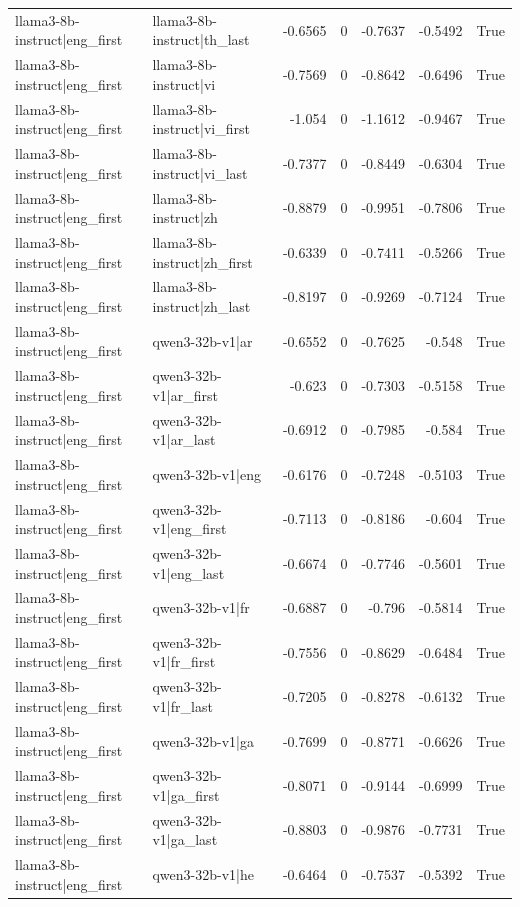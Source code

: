 \begin{table}
\begin{tabular}{l l r r r r l}
llama3-8b-instruct|eng_first & llama3-8b-instruct|th_last & -0.6565 & 0 & -0.7637 & -0.5492 & True \\
llama3-8b-instruct|eng_first & llama3-8b-instruct|vi & -0.7569 & 0 & -0.8642 & -0.6496 & True \\
llama3-8b-instruct|eng_first & llama3-8b-instruct|vi_first & -1.054 & 0 & -1.1612 & -0.9467 & True \\
llama3-8b-instruct|eng_first & llama3-8b-instruct|vi_last & -0.7377 & 0 & -0.8449 & -0.6304 & True \\
llama3-8b-instruct|eng_first & llama3-8b-instruct|zh & -0.8879 & 0 & -0.9951 & -0.7806 & True \\
llama3-8b-instruct|eng_first & llama3-8b-instruct|zh_first & -0.6339 & 0 & -0.7411 & -0.5266 & True \\
llama3-8b-instruct|eng_first & llama3-8b-instruct|zh_last & -0.8197 & 0 & -0.9269 & -0.7124 & True \\
llama3-8b-instruct|eng_first & qwen3-32b-v1|ar & -0.6552 & 0 & -0.7625 & -0.548 & True \\
llama3-8b-instruct|eng_first & qwen3-32b-v1|ar_first & -0.623 & 0 & -0.7303 & -0.5158 & True \\
llama3-8b-instruct|eng_first & qwen3-32b-v1|ar_last & -0.6912 & 0 & -0.7985 & -0.584 & True \\
llama3-8b-instruct|eng_first & qwen3-32b-v1|eng & -0.6176 & 0 & -0.7248 & -0.5103 & True \\
llama3-8b-instruct|eng_first & qwen3-32b-v1|eng_first & -0.7113 & 0 & -0.8186 & -0.604 & True \\
llama3-8b-instruct|eng_first & qwen3-32b-v1|eng_last & -0.6674 & 0 & -0.7746 & -0.5601 & True \\
llama3-8b-instruct|eng_first & qwen3-32b-v1|fr & -0.6887 & 0 & -0.796 & -0.5814 & True \\
llama3-8b-instruct|eng_first & qwen3-32b-v1|fr_first & -0.7556 & 0 & -0.8629 & -0.6484 & True \\
llama3-8b-instruct|eng_first & qwen3-32b-v1|fr_last & -0.7205 & 0 & -0.8278 & -0.6132 & True \\
llama3-8b-instruct|eng_first & qwen3-32b-v1|ga & -0.7699 & 0 & -0.8771 & -0.6626 & True \\
llama3-8b-instruct|eng_first & qwen3-32b-v1|ga_first & -0.8071 & 0 & -0.9144 & -0.6999 & True \\
llama3-8b-instruct|eng_first & qwen3-32b-v1|ga_last & -0.8803 & 0 & -0.9876 & -0.7731 & True \\
llama3-8b-instruct|eng_first & qwen3-32b-v1|he & -0.6464 & 0 & -0.7537 & -0.5392 & True \\

\end{tabular}
\end{table}
